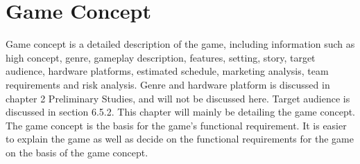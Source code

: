 \chapter{Game Concept}

	Game concept is a detailed description of the game, including information such as high concept,
	genre, gameplay description, features, setting, story, target audience, hardware platforms,
	estimated schedule, marketing analysis, team requirements and risk analysis. \cite{gameConcept}
	Genre and hardware platform is discussed in chapter 2 Preliminary Studies, and will not be
	discussed here. Target audience is discussed in section 6.5.2. This chapter will mainly be
	detailing the game concept. The game concept is the basis for the game's functional requirement.
	It is easier to explain the game as well as decide on the functional requirements for the game
	on the basis of the game concept.
